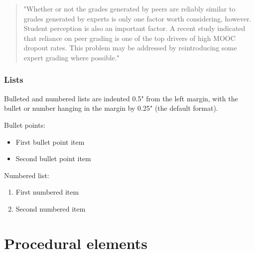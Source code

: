 \documentclass[
	letterpaper, %
]{jdf}
\begin{document}
\begin{Abstract}
\begin{quotation}
"Whether or not the grades generated by peers are reliably similar to grades generated by experts is only one factor worth considering, however. Student perception is also an important factor. A recent study indicated that reliance on peer grading is one of the top drivers of high MOOC dropout rates. This problem may be addressed by reintroducing some expert grading where possible." \citep{joyner2016}
\end{quotation}

\subsubsection{Lists}
Bulleted and numbered lists are indented 0.5" from the left margin, with the bullet or number hanging in the margin by 0.25" (the default format).

Bullet points:

\begin{itemize}
	\item First bullet point item
	\item Second bullet point item
\end{itemize}

Numbered list:

\begin{enumerate}
	\item First numbered item
	\item Second numbered item
\end{enumerate}

\section{Procedural elements}

\end{Abstract}
\end{document}
